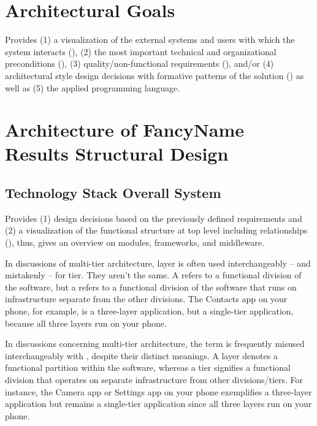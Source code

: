 \documentclass[conference,a4paper,flushend]{cs-techrep}
\begin{document}
\section{Architectural Goals} %
Provides
(1) a visualization of the external systems and users with which the system interacts (),
(2) the most important technical and organizational preconditions (),
(3) quality/non-functional requirements (), and/or
(4) architectural style design decisions with formative patterns of the solution ()
as well as (5) the applied programming language.

\section{Architecture of FancyName \textbar{} Results \textbar{} Structural Design \textbar{}  }

\subsection{Technology Stack \textbar{} Overall System} %
Provides
(1) design decisions based on the previously defined requirements and
(2) a visualization of the functional structure at top level including relationships (), thus, gives an overview on modules, frameworks, and middleware.

In discussions of multi-tier architecture, layer is often used interchangeably -- and mistakenly -- for tier. They aren't the same. A  refers to a functional division of the software, but a  refers to a functional division of the software that runs on infrastructure separate from the other divisions. The Contacts app on your phone, for example, is a three-layer application, but a single-tier application, because all three layers run on your phone.

In discussions concerning multi-tier architecture, the term  is frequently misused interchangeably with , despite their distinct meanings. A layer denotes a functional partition within the software, whereas a tier signifies a functional division that operates on separate infrastructure from other divisions/tiers. For instance, the Camera app or Settings app on your phone exemplifies a three-layer application but remains a single-tier application since all three layers run on your phone.
\end{document}
